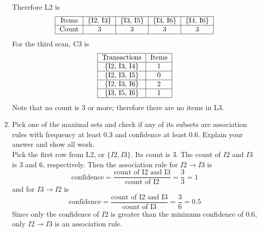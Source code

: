 \documentclass[12pt]{article}
\begin{document}
\begin{enumerate}
Therefore L2 is $$ \begin{tabular}{|c|c|c|c|c|} \hline 
Items & \{I2, I3\} & \{I3, I5\} & \{I3, I6\} & \{I4, I6\} \\ \hline 
Count & 3 & 3 & 3 & 3 \\ \hline \end{tabular} $$ 
For the third scan, C3 is $$ \begin{tabular}{|c|c|} \hline 
Transactions & Items \\ \hline 
\{I2, I3, I4\} & 1 \\ \hline 
\{I2, I3, I5\} & 0 \\ \hline 
\{I2, I3, I6\} & 2 \\ \hline 
\{I3, I5, I6\} & 1 \\ \hline \end{tabular} $$ 
Note that no count is $3$ or more; therefore there are no items in L3. 

\item Pick one of the maximal sets and check if any of its subsets are association rules with frequency at least $0.3$ and confidence at least $0.6$. Explain your answer and show all work. \\
Pick the first row from L2, or $\{I2, I3\}$. Its count is $3$. The count of $I2$ and $I3$ is $3$ and $6$, respectively. Then the association rule for $I2 \to I3$ is
$$\text{confidence} =  \frac{\text{count of I2 and I3}}{\text{count of I2}} = \frac{3}{3} = 1 $$ 
and for $I3 \to I2$ is $$\text{confidence} =  \frac{\text{count of I2 and I3}}{\text{count of I3}} = \frac{3}{6} = 0.5 $$ 
Since only the confidence of $I2$ is greater than the minimum confidence of $0.6$, only $I2 \to I3$ is an association rule. 

\end{enumerate} 
\end{document}
